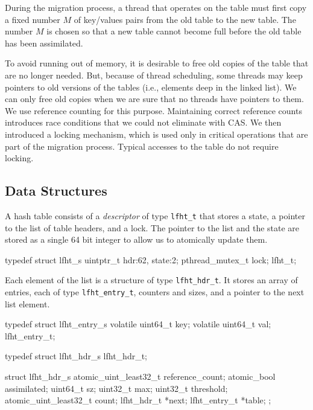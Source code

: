 During the migration process, a thread that operates on the table must
first copy a fixed number $M$ of key/values pairs from the old table
to the new table. The number $M$ is chosen so that a new table cannot
become full before the old table has been assimilated.

To avoid running out of memory, it is desirable to free old copies of
the table that are no longer needed. But, because of thread
scheduling, some threads may keep pointers to old versions of the
tables (i.e., elements deep in the linked list). We can only free old
copies when we are sure that no threads have pointers to them. We use
reference counting for this purpose. Maintaining correct reference
counts introduces race conditions that we could not eliminate with
CAS.  We then introduced a locking mechanism, which is used only in
critical operations that are part of the migration process. Typical
accesses to the table do not require locking.


\subsection{Data Structures}

A hash
table consists of a {\em descriptor\/} of type \texttt{lfht\_t} that
stores a state, a pointer to the list of table headers, and a lock.
The pointer to the list and the state are stored as a single 64 bit integer
to allow us to atomically update them.
\begin{center}
\begin{clisting}
typedef struct lfht_s {
  uintptr_t hdr:62, state:2;
  pthread_mutex_t lock;
} lfht_t;
\end{clisting}
\end{center}
Each
element of the list is a structure of type \texttt{lfht\_hdr\_t}. It
stores an array of entries, each of type \texttt{lfht\_entry\_t}, counters and sizes, and a pointer to the
next list element.
\begin{center}
\begin{clisting}
typedef struct lfht_entry_s {
  volatile uint64_t  key;
  volatile uint64_t  val;
} lfht_entry_t;

typedef struct lfht_hdr_s lfht_hdr_t;

struct lfht_hdr_s {
  atomic_uint_least32_t reference_count;
  atomic_bool assimilated;
  uint64_t sz;
  uint32_t max;
  uint32_t threshold;
  atomic_uint_least32_t count;
  lfht_hdr_t *next;
  lfht_entry_t *table;
};
\end{clisting}
\end{center}

